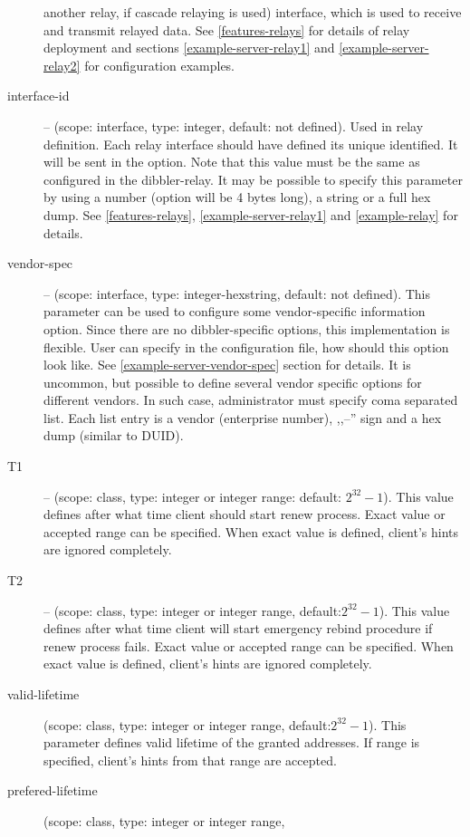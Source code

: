 \begin{description}
	    another relay, if cascade relaying is used) interface,
	    which is used to receive and transmit relayed data. See
	    \ref{features-relays} for details of relay deployment and
	    sections \ref{example-server-relay1} and
	    \ref{example-server-relay2} for configuration examples.
\item[interface-id] -- (scope: interface, type: integer, default: not
	    defined). Used in relay definition. Each relay interface
	    should have defined its unique identified. It will be sent
	    in the  option. Note that this value
	    must be the same as configured in the dibbler-relay. It
	    may be possible to specify this parameter by using a
	    number (option will be 4 bytes long), a string or a full
	    hex dump.  See
	    \ref{features-relays}, \ref{example-server-relay1} and
	    \ref{example-relay} for details.
 \item[vendor-spec] -- (scope: interface, type: integer-hexstring,
	    default: not defined). This parameter can be used to
	    configure some vendor-specific information option. Since
	    there are no dibbler-specific options, this implementation
	    is flexible. User can specify in the configuration file,
	    how should this option look like. See
	    \ref{example-server-vendor-spec} section for details. It
	    is uncommon, but possible to define several vendor
	    specific options for different vendors. In such case,
	    administrator must specify coma separated list. Each list
	    entry is a vendor (enterprise number), ,,--'' sign and a
	    hex dump (similar to DUID).
 \item[T1] -- (scope: class, type: integer or integer range: default:
	    $2^{32}-1$). This value
	    defines after what time client should start renew
	    process. Exact value or accepted range can be
	    specified. When exact value is defined, client's hints are
	    ignored completely.
 \item[T2] -- (scope: class, type: integer or integer range, default:$2^{32}-1$). This value
	    defines after what time client will start emergency rebind
	    procedure if renew process fails. Exact value or accepted range can be
	    specified. When exact value is defined, client's hints are
	    ignored completely.
\item[valid-lifetime] (scope: class, type: integer or integer range,
	    default:$2^{32}-1$). This parameter defines valid lifetime of
	    the granted addresses. If range is specified, client's
	    hints from that range are accepted.
\item[prefered-lifetime] (scope: class, type: integer or integer range,

\end{description}
